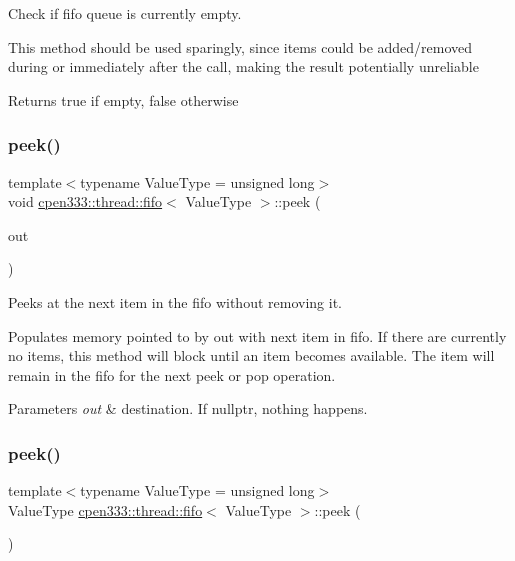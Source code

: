 Check if fifo queue is currently empty. 

This method should be used sparingly, since items could be added/removed during or immediately after the call, making the result potentially unreliable

\begin{DoxyReturn}{Returns}
{\ttfamily true} if empty, {\ttfamily false} otherwise 
\end{DoxyReturn}
\mbox{\label{classcpen333_1_1thread_1_1fifo_a92290d2ef599d0e05f5a869f71bef2db}} 
\subsubsection{\texorpdfstring{peek()}{peek()}\hspace{0.1cm}{\footnotesize\ttfamily [1/2]}}
{\footnotesize\ttfamily template$<$typename Value\+Type  = unsigned long$>$ \\
void \hyperlink{classcpen333_1_1thread_1_1fifo}{cpen333\+::thread\+::fifo}$<$ Value\+Type $>$\+::peek (\begin{DoxyParamCaption}\item[{Value\+Type $\ast$}]{out }\end{DoxyParamCaption})\hspace{0.3cm}{\ttfamily [inline]}}



Peeks at the next item in the fifo without removing it. 

Populates memory pointed to by {\ttfamily out} with next item in fifo. If there are currently no items, this method will block until an item becomes available. The item will remain in the fifo for the next {\ttfamily peek} or {\ttfamily pop} operation.


\begin{DoxyParams}{Parameters}
{\em out} & destination. If {\ttfamily nullptr}, nothing happens. \\
\hline
\end{DoxyParams}
\mbox{\label{classcpen333_1_1thread_1_1fifo_a92cb2efc91d788736f6ea8741b1cf4a5}} 
\subsubsection{\texorpdfstring{peek()}{peek()}\hspace{0.1cm}{\footnotesize\ttfamily [2/2]}}
{\footnotesize\ttfamily template$<$typename Value\+Type  = unsigned long$>$ \\
Value\+Type \hyperlink{classcpen333_1_1thread_1_1fifo}{cpen333\+::thread\+::fifo}$<$ Value\+Type $>$\+::peek (\begin{DoxyParamCaption}{ }\end{DoxyParamCaption})\hspace{0.3cm}{\ttfamily [inline]}}




